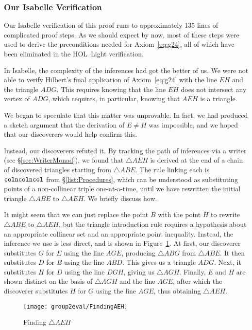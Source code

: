 \subsubsection{Our Isabelle Verification}
Our Isabelle verification of this proof runs to approximately 135 lines of complicated proof steps. As we should expect by now, most of these steps were used to derive the preconditions needed for Axiom~\ref{eq:g24}, all of which have been eliminated in the HOL~Light verification. 

In Isabelle, the complexity of the inferences had got the better of us. We were not able to verify Hilbert's final application of Axiom~\ref{eq:g24} with the line $EH$ and the triangle $ADG$. This requires knowing that the line $EH$ does not intersect any vertex of $ADG$, which requires, in particular, knowing that $AEH$ is a triangle.

We began to speculate that this matter was unprovable. In fact, we had produced a sketch argument that the derivation of $E\neq H$ was impossible, and we hoped that our discoverers would help confirm this.

\label{sec:CombinatoryError}Instead, our discoverers refuted it. By tracking the path of inferences via a writer (see \S\ref{sec:WriterMonad}), we found that $\triangle AEH$ is derived at the end of a chain of discovered triangles starting from $\triangle ABE$. The rule linking each is $\texttt{colncolncol}$ from \S\ref{list:Procedures}, which can be understood as substituting points of a non-collinear triple one-at-a-time, until we have rewritten the initial triangle $\triangle ABE$ to $\triangle AEH$. We briefly discuss how.

It might seem that we can just replace the point $B$ with the point $H$ to rewrite $\triangle ABE$ to $\triangle AEH$, but the triangle introduction rule requires a hypothesis about an appropriate collinear set and an appropriate point inequality. Instead, the inference we use is less direct, and is shown in Figure~\ref{fig:FindingAEH}. At first, our discoverer substitutes $G$ for $E$ using the line $AGE$, producing $\triangle ABG$ from $\triangle ABE$. It then substitutes $D$ for $B$ using the line $ABD$. This gives us a triangle $ADG$. Next, it substitutes $H$ for $D$ using the line $DGH$, giving us $\triangle AGH$. Finally, $E$ and $H$ are shown distinct on the basis of $\triangle AGH$ and the line $AGE$, after which the discoverer substitutes $H$ for $G$ using the line $AGE$, thus obtaining $\triangle AEH$.

\begin{figure}
\centering\texttt{[image: group2eval/FindingAEH]}
\caption{Finding $\triangle AEH$}
\label{fig:FindingAEH}
\end{figure}

